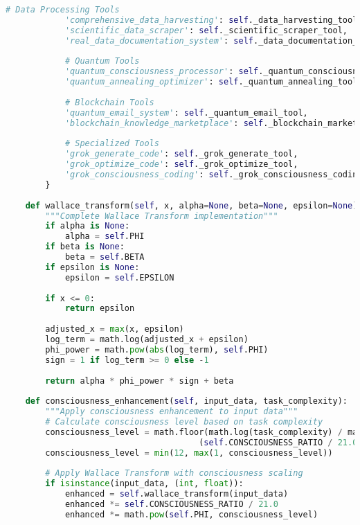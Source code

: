\documentclass[11pt,a4paper]{article}
\begin{document}
\begin{lstlisting}[language=Python, caption=chAIos Complete Implementation]
            # Data Processing Tools
            'comprehensive_data_harvesting': self._data_harvesting_tool,
            'scientific_data_scraper': self._scientific_scraper_tool,
            'real_data_documentation_system': self._data_documentation_tool,
            
            # Quantum Tools
            'quantum_consciousness_processor': self._quantum_consciousness_tool,
            'quantum_annealing_optimizer': self._quantum_annealing_tool,
            
            # Blockchain Tools
            'quantum_email_system': self._quantum_email_tool,
            'blockchain_knowledge_marketplace': self._blockchain_marketplace_tool,
            
            # Specialized Tools
            'grok_generate_code': self._grok_generate_tool,
            'grok_optimize_code': self._grok_optimize_tool,
            'grok_consciousness_coding': self._grok_consciousness_coding_tool
        }
    
    def wallace_transform(self, x, alpha=None, beta=None, epsilon=None):
        """Complete Wallace Transform implementation"""
        if alpha is None:
            alpha = self.PHI
        if beta is None:
            beta = self.BETA
        if epsilon is None:
            epsilon = self.EPSILON
            
        if x <= 0:
            return epsilon
            
        adjusted_x = max(x, epsilon)
        log_term = math.log(adjusted_x + epsilon)
        phi_power = math.pow(abs(log_term), self.PHI)
        sign = 1 if log_term >= 0 else -1
        
        return alpha * phi_power * sign + beta
    
    def consciousness_enhancement(self, input_data, task_complexity):
        """Apply consciousness enhancement to input data"""
        # Calculate consciousness level based on task complexity
        consciousness_level = math.floor(math.log(task_complexity) / math.log(self.PHI) * 
                                       (self.CONSCIOUSNESS_RATIO / 21.0))
        consciousness_level = min(12, max(1, consciousness_level))
        
        # Apply Wallace Transform with consciousness scaling
        if isinstance(input_data, (int, float)):
            enhanced = self.wallace_transform(input_data)
            enhanced *= self.CONSCIOUSNESS_RATIO / 21.0
            enhanced *= math.pow(self.PHI, consciousness_level)
            

\end{lstlisting}
\end{document}
